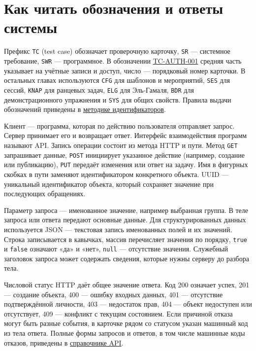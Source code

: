 \documentclass[12pt,a4paper]{article}
\begin{document}
\section{Как читать обозначения и ответы системы}\label{ux43aux430ux43a-ux447ux438ux442ux430ux442ux44c-ux43eux431ux43eux437ux43dux430ux447ux435ux43dux438ux44f-ux438-ux43eux442ux432ux435ux442ux44b-ux441ux438ux441ux442ux435ux43cux44b}

\hypertarget{как-читать-обозначения-и-ответы-системы}{}

Префикс \texttt{TC} (test case) обозначает проверочную карточку, \texttt{SR} --- системное требование, \texttt{SWR} --- программное. В обозначении {\hyperlink{tc-auth-001}{TC-AUTH-001}} средняя часть указывает на учётные записи и доступ, число --- порядковый номер карточки. В остальных главах используются \texttt{CFG} для шаблонов и мероприятий, \texttt{SES} для сессий, \texttt{KNAP} для ранцевых задач, \texttt{ELG} для Эль-Гамаля, \texttt{BDR} для демонстрационного упражнения и \texttt{SYS} для общих свойств. Правила выдачи обозначений приведены в {\href{../02\_Общие\_соглашения/Методика\_идентификаторов.pdf\#методика-идентификаторов}{методике идентификаторов}}.

Клиент --- программа, которая по действию пользователя отправляет запрос. Сервер принимает его и возвращает ответ. Интерфейс взаимодействия программ называют API. Запись операции состоит из метода HTTP и пути. Метод \texttt{GET} запрашивает данные, \texttt{POST} инициирует указанное действие (например, создание или публикацию), \texttt{PUT} передаёт изменения или ответ на задачу. Имя в фигурных скобках в пути заменяют идентификатором конкретного объекта. UUID --- уникальный идентификатор объекта, который сохраняет значение при последующих обращениях.

Параметр запроса --- именованное значение, например выбранная группа. В теле запроса или ответа передают основные данные. Для структурированных данных используется JSON --- текстовая запись именованных полей и их значений. Строка записывается в кавычках, массив перечисляет значения по порядку, \texttt{true} и \texttt{false} означают «да» и «нет», \texttt{null} --- отсутствие значения. Служебный заголовок запроса может содержать сведения, которые нужны серверу до разбора тела.

Числовой статус HTTP даёт общее значение ответа. Код 200 означает успех, 201 --- создание объекта, 400 --- ошибку входных данных, 401 --- отсутствие подтверждённой личности, 403 --- недостаток прав, 404 --- объект недоступен или отсутствует, 409 --- конфликт с текущим состоянием. Если причиной отказа могут быть разные события, в карточке рядом со статусом указан машинный код из тела ответа. Полные формы запросов и ответов, в том числе машинные коды отказов, приведены в {\href{../09\_Архитектура\_и\_API/DOC-08\_Справочник\_API.pdf\#doc-08-справочник-api-платформы}{справочнике API}}.
\end{document}
